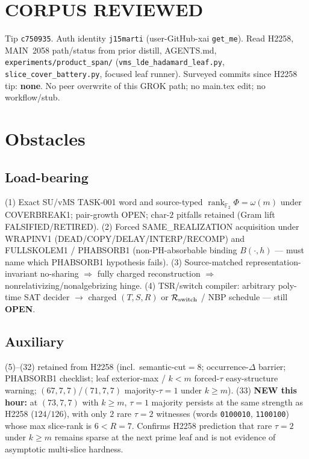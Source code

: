 \documentclass[11pt]{article}
\begin{document}
\section*{CORPUS REVIEWED}
Tip \texttt{c750935}. Auth identity \texttt{j15marti} (user-GitHub-xai \texttt{get\_me}).
Read H2258, MAIN~2058 path/status from prior distill, AGENTS.md,
\texttt{experiments/product\_span/} (\texttt{vms\_lde\_hadamard\_leaf.py},
\texttt{slice\_cover\_battery.py}, focused leaf runner).
Surveyed commits since H2258 tip: \textbf{none}.
No peer overwrite of this GROK path; no main.tex edit; no workflow/stub.

\section*{Obstacles}
\subsection*{Load-bearing}
(1) Exact SU/vMS TASK-001 word and source-typed
$\operatorname{rank}_{\mathbb F_2}\Phi=\omega(m)$ under COVERBREAK1; pair-growth OPEN;
char-$2$ pitfalls retained (Gram lift FALSIFIED/RETIRED).
(2) Forced SAME\_REALIZATION acquisition under WRAPINV1
(DEAD/COPY/DELAY/INTERP/RECOMP) and FULLSKOLEM1 / PHABSORB1
(non-PH-absorbable binding $B(\cdot,h)$ --- must name which PHABSORB1 hypothesis fails).
(3) Source-matched representation-invariant no-sharing $\Rightarrow$ fully charged reconstruction
$\Rightarrow$ nonrelativizing/nonalgebrizing hinge.
(4) TSR/switch compiler: arbitrary poly-time SAT decider $\to$ charged $(T,S,R)$ or
$\mathcal R_{\rm switch}$ / NBP schedule --- still \textbf{OPEN}.

\subsection*{Auxiliary}
(5)--(32) retained from H2258 (incl.\ semantic-cut$=8$; occurrence-$\Delta$ barrier;
PHABSORB1 checklist; leaf exterior-max / $k{<}m$ forced-$\tau$ easy-structure warning;
$(67,7,7)$/$(71,7,7)$ majority-$\tau{=}1$ under $k{\ge}m$).
(33) \textbf{NEW this hour:} at $(73,7,7)$ with $k{\ge}m$, $\tau{=}1$ majority persists
at the same strength as H2258 ($124/126$), with only $2$ rare $\tau{=}2$ witnesses
(words \texttt{0100010}, \texttt{1100100}) whose max slice-rank is $6{<}R{=}7$.
Confirms H2258 prediction that rare $\tau{=}2$ under $k{\ge}m$ remains sparse at the next
prime leaf and is not evidence of asymptotic multi-slice hardness.
\end{document}
